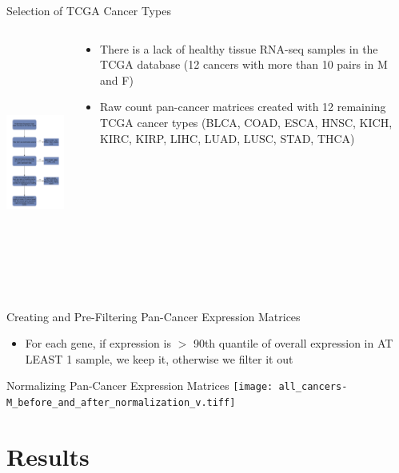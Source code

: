 \documentclass{beamer}
\begin{document}
	\begin{frame}{Selection of TCGA Cancer Types}
			\begin{columns}
				\begin{column}{0.45\textwidth}
					\includegraphics[width=5cm, height=8cm]{img3.png}
				\end{column}
				\begin{column}{0.5\textwidth}
					\begin{itemize}
						\item There is a lack of healthy tissue RNA-seq samples in the TCGA database (12 cancers with more than 10 pairs in M and F)
						\item Raw count pan-cancer matrices created with 12 remaining TCGA cancer types (BLCA, COAD, ESCA, HNSC, KICH, KIRC, KIRP, LIHC, LUAD, LUSC, STAD, THCA)
					\end{itemize}
				\end{column}
			\end{columns}			
	\end{frame}

	\begin{frame}{Creating and Pre-Filtering Pan-Cancer Expression Matrices}
		\begin{itemize}
			\item For each gene, if expression is $>$ 90th quantile of overall expression in AT LEAST 1 sample, we keep it, otherwise we filter it out
		\end{itemize}
	\end{frame}

	\begin{frame}{Normalizing Pan-Cancer Expression Matrices}
		\texttt{[image: all\_cancers-M\_before\_and\_after\_normalization\_v.tiff]}
	\end{frame}

	\section{Results}

	
\end{document}
